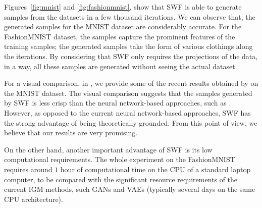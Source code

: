 Figures~\ref{fig:mnist} and \ref{fig:fashionmnist}, show that SWF is able to generate samples from the datasets in a few thousand iterations. We can observe that, the generated samples for the MNIST dataset are considerably accurate. For the FashionMNIST dataset, the samples capture the prominent features of the training samples; the generated samples take the form of various clothings along the iterations. By considering that SWF only requires the projections of the data, in a way, all these samples are generated without seeing the actual dataset.

For a visual comparison, in \supp{}, we provide some of the recent results obtained by \cite{deshpande2018generative} on the MNIST dataset. The visual comparison suggests that the samples generated by SWF is less crisp than the neural network-based approaches, such as \cite{goodfellow2014generative,arjovsky2017wasserstein,deshpande2018generative}. However, as opposed to the current neural network-based approaches, SWF has the strong advantage of being theoretically grounded. From this point of view, we believe that our results are very promising. 





On the other hand, another important advantage of SWF is its low computational requirements. The whole experiment on the FashionMNIST requires around $1$ hour of computational time on the CPU of a standard laptop computer, to be compared with the significant resource requirements of the current IGM methods, such GANs and VAEs (typically several days on the same CPU architecture).




















